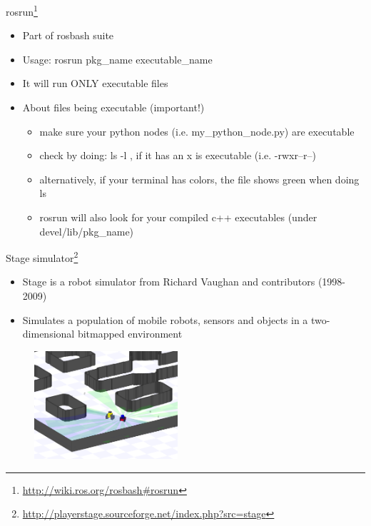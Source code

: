 \documentclass{beamer}
\begin{document}

\begin{frame}{rosrun\footnote{\url{http://wiki.ros.org/rosbash\#rosrun}}}
	\begin{itemize}
		\item Part of rosbash suite
		\item Usage: rosrun pkg\_name executable\_name
		\item It will run ONLY executable files
		\item About files being executable (important!)
		\begin{itemize}
			\item make sure your python nodes (i.e. my\_python\_node.py) are executable
			\item check by doing: ls -l , if it has an x is executable (i.e. -rwxr--r--)
			\item alternatively, if your terminal has colors, the file shows green when doing ls
			\item rosrun will also look for your compiled c++ executables (under devel/lib/pkg\_name)
		\end{itemize}
	\end{itemize}
	
\end{frame}


\begin{frame}{Stage simulator\footnote{\url{http://playerstage.sourceforge.net/index.php?src=stage}}}
	\begin{itemize}
		\item Stage is a robot simulator from Richard Vaughan and contributors (1998-2009)
		\item Simulates a population of mobile robots, sensors and objects in a two-dimensional bitmapped environment
	\end{itemize}
	
	\begin{figure}[H]
		\centering
		\includegraphics[height=4.0cm]{images/stage_simulator.png}
	\end{figure}
	
\end{frame}
\end{document}

